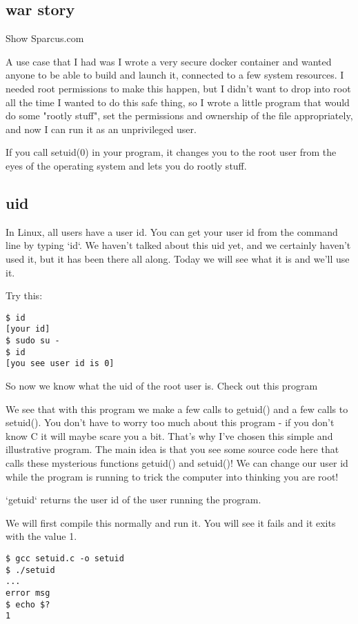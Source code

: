 \documentclass[12pt]{article}
\begin{document}
\subsection{war story}
Show Sparcus.com

A use case that I had was I wrote a very secure docker container and wanted anyone to be able to build and launch it, connected to a few system resources. I needed root permissions to make this happen, but I didn't want to drop into root all the time I wanted to do this safe thing, so I wrote a little program that would do some "rootly stuff", set the permissions and ownership of the file appropriately, and now I can run it as an unprivileged user.

If you call setuid(0) in your program, it changes you to the root user from the eyes of the operating system and lets you do rootly stuff.

\subsection{uid}
In Linux, all users have a user id. You can get your user id from the command line by typing `id`. We haven't talked about this uid yet, and we certainly haven't used it, but it has been there all along. Today we will see what it is and we'll use it.

Try this:
\begin{lstlisting}
$ id
[your id]
$ sudo su -
$ id
[you see user id is 0]
\end{lstlisting}

So now we know what the uid of the root user is. Check out this program




We see that with this program we make a few calls to getuid() and a few calls to setuid(). You don't have to worry too much about this program - if you don't know C it will maybe scare you a bit. That's why I've chosen this simple and illustrative program.  The main idea is that you see some source code here that calls these mysterious functions getuid() and setuid()! We can change our user id while the program is running to trick the computer into thinking you are root!

`getuid` returns the user id of the user running the program.


We will first compile this normally and run it. You will see it fails and it exits with the value 1.

\begin{lstlisting}
$ gcc setuid.c -o setuid
$ ./setuid
...
error msg
$ echo $?
1
\end{lstlisting}
\end{document}

